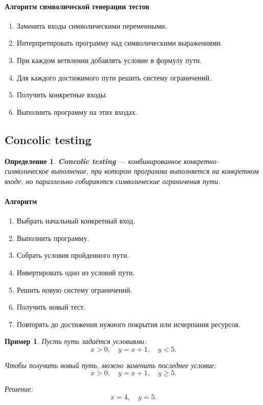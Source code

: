 \documentclass[12pt,a4paper]{article}
\newtheorem{definition}{Определение}
\newtheorem{example}{Пример}
\begin{document}
\paragraph{Алгоритм символической генерации тестов}

\begin{enumerate}
    \item Заменить входы символическими переменными.
    \item Интерпретировать программу над символическими выражениями.
    \item При каждом ветвлении добавлять условие в формулу пути.
    \item Для каждого достижимого пути решить систему ограничений.
    \item Получить конкретные входы.
    \item Выполнить программу на этих входах.
\end{enumerate}

\subsection{Concolic testing}

\begin{definition}
\textbf{Concolic testing} --- комбинированное конкретно-символическое выполнение, при котором программа выполняется на конкретном входе, но параллельно собираются символические ограничения пути.
\end{definition}

\paragraph{Алгоритм}

\begin{enumerate}
    \item Выбрать начальный конкретный вход.
    \item Выполнить программу.
    \item Собрать условия пройденного пути.
    \item Инвертировать одно из условий пути.
    \item Решить новую систему ограничений.
    \item Получить новый тест.
    \item Повторять до достижения нужного покрытия или исчерпания ресурсов.
\end{enumerate}

\begin{example}
Пусть путь задаётся условиями:
\[
x>0,\quad y=x+1,\quad y<5.
\]

Чтобы получить новый путь, можно заменить последнее условие:
\[
x>0,\quad y=x+1,\quad y\geq 5.
\]

Решение:
\[
x=4,\quad y=5.
\]
\end{example}
\end{document}
